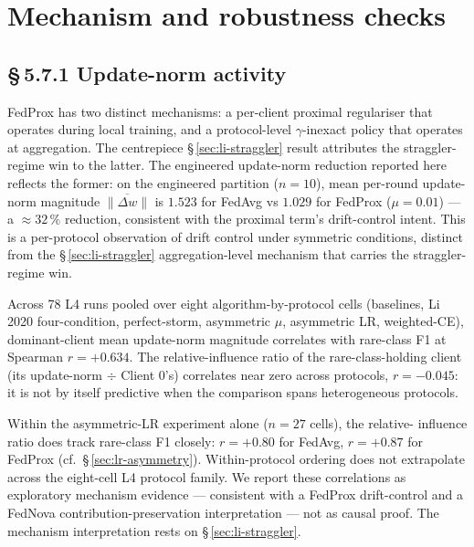 \documentclass[11pt,a4paper]{report}
\begin{document}


\section{Mechanism and robustness checks}
\label{sec:mechanism-robustness}


\subsection*{\S\,5.7.1 Update-norm activity}

FedProx has two distinct mechanisms: a per-client proximal regulariser
that operates during local training, and a protocol-level $\gamma$-inexact
policy that operates at aggregation. The centrepiece
\S\,\ref{sec:li-straggler} result attributes the straggler-regime win to
the latter. The engineered update-norm reduction reported here reflects
the former: on the engineered partition ($n=10$), mean per-round
update-norm magnitude $\overline{\lVert \Delta w \rVert}$ is $1.523$ for
FedAvg vs $1.029$ for FedProx ($\mu = 0.01$) --- a $\approx 32\,\%$
reduction, consistent with the proximal term's drift-control intent. This
is a per-protocol observation of drift control under symmetric conditions,
distinct from the \S\,\ref{sec:li-straggler} aggregation-level mechanism
that carries the straggler-regime win.

Across 78 L4 runs pooled over eight algorithm-by-protocol cells (baselines,
Li 2020 four-condition, perfect-storm, asymmetric $\mu$, asymmetric LR,
weighted-CE), dominant-client mean update-norm magnitude correlates with
rare-class F1 at Spearman $r = +0.634$. The relative-influence ratio of the
rare-class-holding client (its update-norm $\div$ Client 0's) correlates
near zero across protocols, $r = -0.045$: it is not by itself predictive
when the comparison spans heterogeneous protocols.

Within the asymmetric-LR experiment alone ($n=27$ cells), the relative-
influence ratio does track rare-class F1 closely: $r = +0.80$ for FedAvg,
$r = +0.87$ for FedProx (cf.\ \S\,\ref{sec:lr-asymmetry}). Within-protocol
ordering does not extrapolate across the eight-cell L4 protocol family. We
report these correlations as exploratory mechanism evidence --- consistent
with a FedProx drift-control and a FedNova contribution-preservation
interpretation --- not as causal proof. The mechanism interpretation rests on
\S\,\ref{sec:li-straggler}.
\end{document}
